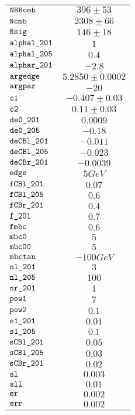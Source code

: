 \begin{tabular}{lc}
$\verb+NBBcmb+ $ & $  396\pm 53$\\
$\verb+Ncmb+ $ & $  2308\pm 66$\\
$\verb+Nsig+ $ & $  146\pm 18$\\
$\verb+alphal_201+ $ & $  1$\\
$\verb+alphal_205+ $ & $  0.4$\\
$\verb+alphar_201+ $ & $ -2.8$\\
$\verb+argedge+ $ & $  5.2850\pm 0.0002$\\
$\verb+argpar+ $ & $ -20$\\
$\verb+c1+ $ & $ -0.407\pm 0.03$\\
$\verb+c2+ $ & $  0.11\pm 0.03$\\
$\verb+de0_201+ $ & $  0.0009$\\
$\verb+de0_205+ $ & $ -0.18$\\
$\verb+deCBl_201+ $ & $ -0.011$\\
$\verb+deCBl_205+ $ & $ -0.023$\\
$\verb+deCBr_201+ $ & $ -0.0039$\\
$\verb+edge+ $ & $  5 GeV$\\
$\verb+fCBl_201+ $ & $  0.07$\\
$\verb+fCBl_205+ $ & $  0.6$\\
$\verb+fCBr_201+ $ & $  0.4$\\
$\verb+f_201+ $ & $  0.7$\\
$\verb+fmbc+ $ & $  0.6$\\
$\verb+mbc0+ $ & $  5$\\
$\verb+mbc00+ $ & $  5$\\
$\verb+mbctau+ $ & $ -100 GeV$\\
$\verb+nl_201+ $ & $  3$\\
$\verb+nl_205+ $ & $  100$\\
$\verb+nr_201+ $ & $  1$\\
$\verb+pow1+ $ & $  7$\\
$\verb+pow2+ $ & $  0.1$\\
$\verb+s1_201+ $ & $  0.01$\\
$\verb+s1_205+ $ & $  0.1$\\
$\verb+sCBl_201+ $ & $  0.05$\\
$\verb+sCBl_205+ $ & $  0.03$\\
$\verb+sCBr_201+ $ & $  0.02$\\
$\verb+sl+ $ & $  0.003$\\
$\verb+sll+ $ & $  0.01$\\
$\verb+sr+ $ & $  0.002$\\
$\verb+srr+ $ & $  0.002$\\
\end{tabular}
